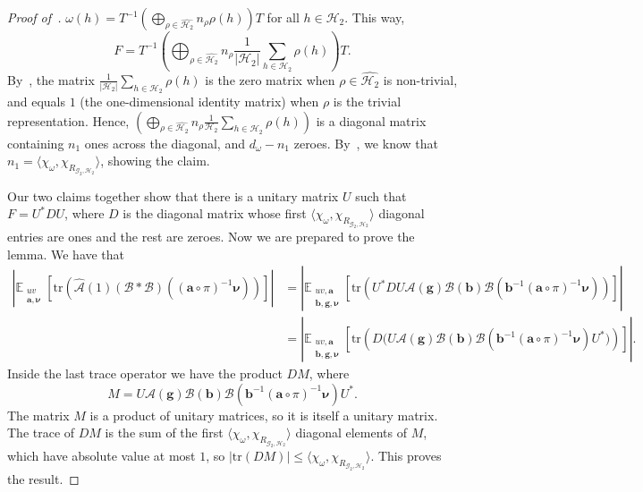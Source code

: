 \documentclass[a4paper,11pt]{article}
\theoremstyle{definition}
\newcommand{\tuple}[1]{{\mathbf{#1}}}
\newcommand{\ex}[1]{\mathbb{E}_{#1}}
\newcommand{\gr}{\mathscr{G}}
\newcommand{\sgr}{\mathscr{H}}
\newcommand{\ba}{\mathbf{a}}
\newcommand{\tr}{\mathrm{tr}}
\newcommand{\A}{\mathcal{A}}
\newcommand{\B}{\mathcal{B}}
\begin{document}
\begin{proof}[Proof of~]
    $\omega(h)=T^{-1}(\bigoplus_{\rho\in \widehat{\sgr_2}} n_\rho \rho(h) )T$ for all $h\in \sgr_2$. This way,
    \[
    F= 
    T^{-1}\left(
    \bigoplus_{\rho\in \widehat{\sgr_2}} n_{\rho} 
    \frac{1}{|\sgr_2|}
    \sum_{h\in \sgr_2} \rho(h)
    \right) T.
    \]
    By~,
    the matrix $ \frac{1}{|\sgr_2|}
    \sum_{h\in \sgr_2} \rho(h)$ is the zero matrix when $\rho\in \widehat{\sgr_2}$ is non-trivial, and equals $1$ (the one-dimensional identity matrix) when $\rho$ is the trivial representation. Hence, $\left(
    \bigoplus_{\rho\in \widehat{\sgr_2}} n_{\rho} 
    \frac{1}{\sgr_2}
    \sum_{h\in \sgr_2} \rho(h)
    \right)$ is a diagonal matrix containing $n_1$ ones across the diagonal, and $d_\omega- n_1$ zeroes. By~, we know that $n_1=\langle \chi_\omega, \chi_{R_{\gr_2,\sgr_2}} \rangle$, showing the claim. \par

Our two claims together show that there is a unitary matrix $U$ such that $F= U^* D U$, where $D$ is the diagonal matrix whose first $\langle\chi_\omega, \chi_{R_{\gr_2,\sgr_2}} \rangle$ diagonal entries are ones and the rest are zeroes. Now we are prepared to prove the lemma. We have that
\begin{align*}
\left| \ex{\substack{uv \\ \tuple{a}, \bm{\nu}}}\left[ \tr\left( \widehat{\A}(1)(\B*\B)((\ba\circ\pi)^{-1} \bm{\nu}) \right) \right] \right| & =
\left|
\ex{\substack{uv, \tuple{a} \\ \tuple{b}, \tuple{g}, \bm{\nu}}} \left[ 
\tr\left(
U^* D U \A(\tuple{g}) \B(\tuple{b}) \B(\tuple{b}^{-1} (\tuple{a}\circ \pi)^{-1} \bm{\nu})
\right)
\right] \right| \\ & =
\left|
\ex{\substack{uv, \tuple{a} \\ \tuple{b}, \tuple{g}, \bm{\nu}}} \left[ 
\tr\left(
 D \Big( U \A(\tuple{g}) \B(\tuple{b}) \B(\tuple{b}^{-1} (\tuple{a}\circ \pi)^{-1} \bm{\nu}) U^* \Big)
\right) 
\right] \right|.
\end{align*}
Inside the last trace operator we have the product $D M$, where 
\[M = U \A(\tuple{g}) \B(\tuple{b}) \B(\tuple{b}^{-1} (\tuple{a}\circ \pi)^{-1} \bm{\nu}) U^*. \] 
The matrix $M$ is a product of unitary matrices, so it is itself a unitary matrix. The trace of $DM$ is the sum of the first $\langle \chi_\omega, \chi_{R_{\gr_2,\sgr_2}} \rangle$ diagonal elements of $M$, which have absolute value at most $1$, so $|\tr(DM)|\leq \langle \chi_\omega, \chi_{R_{\gr_2,\sgr_2}} \rangle$. This proves the result.   
 \end{proof}
\end{document}
